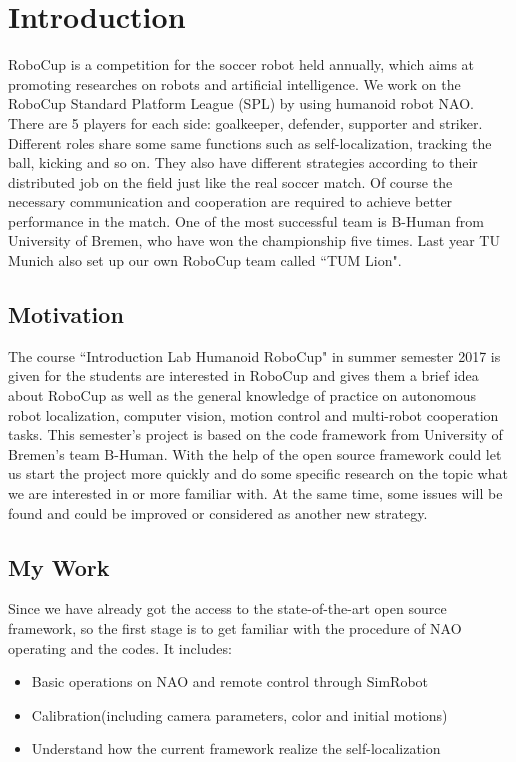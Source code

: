 \chapter{Introduction}
RoboCup is a competition for the soccer robot held annually, which aims at promoting researches on robots and artificial intelligence. We work on the RoboCup Standard Platform League (SPL) by using humanoid robot NAO. There are 5 players for each side: goalkeeper, defender, supporter and striker. Different roles share some same functions such as self-localization, tracking the ball, kicking and so on. They also have different strategies according to their distributed job on the field just like the real soccer match. Of course the necessary communication and cooperation are required to achieve better performance in the match. One of the most successful team is B-Human from University of Bremen, who have won the championship five times. Last year TU Munich also set up our own RoboCup team called ``TUM Lion".
\section{Motivation}
The course ``Introduction Lab Humanoid RoboCup" in summer semester 2017 is given for the students are interested in RoboCup and gives them a brief idea about RoboCup as well as the general knowledge of practice on autonomous robot localization, computer vision, motion control and multi-robot cooperation tasks. This semester's project is based on the code framework from University of Bremen's team B-Human. With the help of the open source framework could let us start the project more quickly and do some specific research on the topic what we are interested in or more familiar with. At the same time, some issues will be found and could be improved or considered as another new strategy.

\section{My Work}
Since we have already got the access to the state-of-the-art open source framework, so the first stage is to get familiar with the procedure of NAO operating and the codes. It includes:
\begin{itemize}
   	\item Basic operations on NAO and remote control through SimRobot
   	\item Calibration(including camera parameters, color and initial motions)
	\item Understand how the current framework realize the self-localization
\end{itemize}

